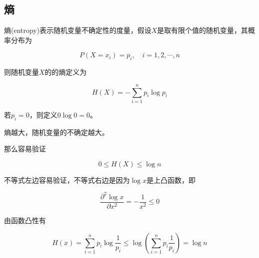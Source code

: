 \subsection{熵}

熵(entropy)表示随机变量不确定性的度量，假设$X$是取有限个值的随机变量，其概率分布为

\begin{equation*}
    P(X = x_i) = p_i,\quad i=1,2,\cdots, n
\end{equation*}

则随机变量$X$的的熵定义为

\begin{equation}
    H(X) = -\sum_{i=1}^np_i\log p_i
\end{equation}

若$p_i=0$，则定义$0\log 0 = 0$。

熵越大，随机变量的不确定越大。

那么容易验证

\begin{equation}
    0 \leq H(X) \leq \log n
\end{equation}

不等式左边容易验证，不等式右边是因为$\log x$是上凸函数，即

\begin{equation*}
    \frac{\partial^2 \log x}{\partial x^2} = -\frac{1}{x^2} \leq 0
\end{equation*}

由函数凸性有

\begin{equation*}
    H(x) = \sum_{i=1}^np_i\log \frac{1}{p_i} \leq \log(\sum_{i=1}^np_i\frac{1}{p_i}) = \log n
\end{equation*}